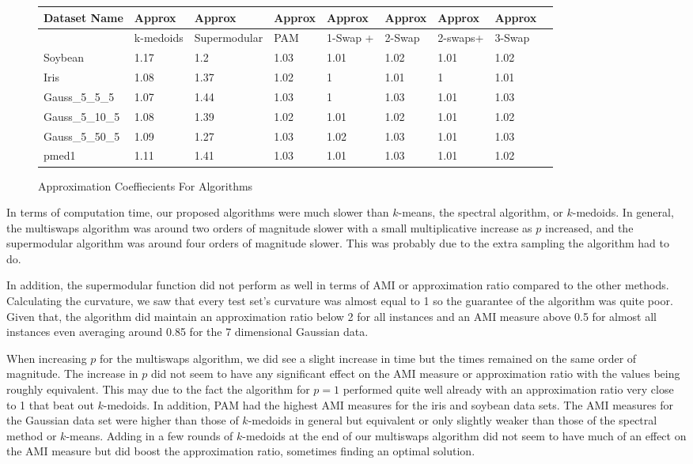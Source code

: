 \documentclass{article}
\begin{document}
\begin{figure*}[h]
\begin{tabular}{ | l | l | l | l | l | l | l | l | l | }
\hline
	Dataset Name & Approx & Approx & Approx & Approx & Approx & Approx & Approx  \\ \hline
	& k-medoids & Supermodular & PAM & 1-Swap + & 2-Swap & 2-swaps+ & 3-Swap   \\ \hline
	Soybean & 1.17 & 1.2 & 1.03 & 1.01 & 1.02 & 1.01 & 1.02  \\ 
	Iris & 1.08 & 1.37 & 1.02 & 1 & 1.01 & 1 & 1.01  \\ 
	Gauss\_5\_5\_5 & 1.07 & 1.44 & 1.03 & 1 & 1.03 & 1.01 & 1.03  \\ 
	Gauss\_5\_10\_5 & 1.08 & 1.39 & 1.02 & 1.01 & 1.02 & 1.01 & 1.02  \\ 
	Gauss\_5\_50\_5 & 1.09 & 1.27 & 1.03 & 1.02 & 1.03 & 1.01 & 1.03  \\ 
	pmed1 & 1.11 & 1.41 & 1.03 & 1.01 & 1.03 & 1.01 & 1.02  \\ \hline
\end{tabular}


\caption{Approximation Coeffiecients For Algorithms}
\end{figure*}



In terms of computation time, our proposed algorithms were much slower than $k$-means, the spectral algorithm, or $k$-medoids. In general, the multiswaps algorithm was around two orders of magnitude slower with a small multiplicative increase as $p$ increased, and the supermodular algorithm was around four orders of magnitude slower. This was probably due to the extra sampling the algorithm had to do. 

In addition, the supermodular function did not perform as well in terms of AMI or approximation ratio compared to the other methods. Calculating the curvature, we saw that every  test set's curvature was almost equal to 1 so the guarantee of the algorithm was quite poor. Given that, the algorithm did maintain an approximation ratio below 2 for all instances and an AMI measure above 0.5 for almost all instances even averaging around 0.85 for the 7 dimensional Gaussian data. 

When increasing $p$ for the multiswaps algorithm, we did see a slight increase in time but the times remained on the same order of magnitude. The increase in $p$ did not seem to have any significant effect on the AMI measure or approximation ratio with the values being roughly equivalent. This may due to the fact the algorithm for $p=1$ performed quite well already with an approximation ratio very close to 1 that beat out $k$-medoids. In addition, PAM had the highest AMI measures for the iris and soybean data sets. The AMI measures for the Gaussian data set were higher than those of $k$-medoids in general but equivalent or only slightly weaker than those of the spectral method or $k$-means. Adding in a few rounds of $k$-medoids at the end of our multiswaps algorithm did not seem to have much of an effect on the AMI measure but did boost the approximation ratio, sometimes finding an optimal solution. 
\end{document}
